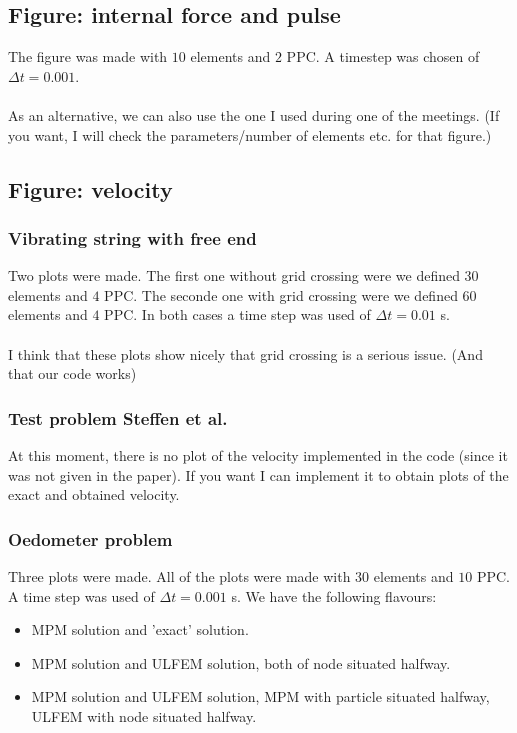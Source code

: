 \documentclass[a4paper,12pt]{report}
\begin{document}
\newpage

\subsection*{Figure: internal force and pulse}
The figure was made with $10$ elements and $2$ PPC. A timestep was chosen of $\Delta t = 0.001$. \\
\\
As an alternative, we can also use the one I used during one of the meetings. (If you want, I will check the parameters/number of elements etc. for that figure.)

\subsection*{Figure: velocity}

\subsubsection*{Vibrating string with free end}
Two plots were made. The first one without grid crossing were we defined $30$ elements and $4$ PPC. The seconde one with grid crossing were we defined $60$ elements and $4$ PPC. In both cases a time step was used of $\Delta t = 0.01$ s. \\
\\
I think that these plots show nicely that grid crossing is a serious issue. (And that our code works)


\subsubsection*{Test problem Steffen et al.}
At this moment, there is no plot of the velocity implemented in the code (since it was not given in the paper). If you want I can implement it to obtain plots of the exact and obtained velocity. 

\subsubsection*{Oedometer problem}
Three plots were made. All of the plots were made with $30$ elements and $10$ PPC. A time step was used of $\Delta t = 0.001$ s. We have the following flavours:

\begin{itemize}
\item MPM solution and 'exact' solution.
\item MPM solution and ULFEM solution, both of node situated halfway.
\item MPM solution and ULFEM solution, MPM with particle situated halfway, ULFEM with node situated halfway.
\end{itemize}
\end{document}
